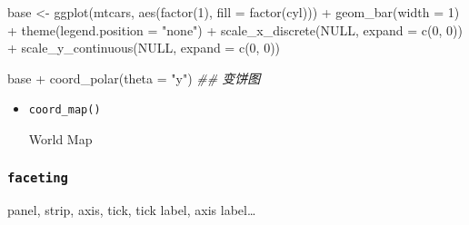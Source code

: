 \documentclass[
]{article}
\newenvironment{Shaded}{}{}
\newcommand{\AttributeTok}[1]{\textcolor[rgb]{0.49,0.56,0.16}{#1}}
\newcommand{\ConstantTok}[1]{\textcolor[rgb]{0.53,0.00,0.00}{#1}}
\newcommand{\DecValTok}[1]{\textcolor[rgb]{0.25,0.63,0.44}{#1}}
\newcommand{\DocumentationTok}[1]{\textcolor[rgb]{0.73,0.13,0.13}{\textit{#1}}}
\newcommand{\FunctionTok}[1]{\textcolor[rgb]{0.02,0.16,0.49}{#1}}
\newcommand{\NormalTok}[1]{#1}
\newcommand{\OtherTok}[1]{\textcolor[rgb]{0.00,0.44,0.13}{#1}}
\newcommand{\SpecialCharTok}[1]{\textcolor[rgb]{0.25,0.44,0.63}{#1}}
\newcommand{\StringTok}[1]{\textcolor[rgb]{0.25,0.44,0.63}{#1}}
\begin{document}
\begin{Shaded}
\begin{Highlighting}[]
\NormalTok{base }\OtherTok{\textless{}{-}} \FunctionTok{ggplot}\NormalTok{(mtcars, }\FunctionTok{aes}\NormalTok{(}\FunctionTok{factor}\NormalTok{(}\DecValTok{1}\NormalTok{), }\AttributeTok{fill =} \FunctionTok{factor}\NormalTok{(cyl))) }\SpecialCharTok{+}
  \FunctionTok{geom\_bar}\NormalTok{(}\AttributeTok{width =} \DecValTok{1}\NormalTok{) }\SpecialCharTok{+} \FunctionTok{theme}\NormalTok{(}\AttributeTok{legend.position =} \StringTok{"none"}\NormalTok{) }\SpecialCharTok{+} 
  \FunctionTok{scale\_x\_discrete}\NormalTok{(}\ConstantTok{NULL}\NormalTok{, }\AttributeTok{expand =} \FunctionTok{c}\NormalTok{(}\DecValTok{0}\NormalTok{, }\DecValTok{0}\NormalTok{)) }\SpecialCharTok{+}
  \FunctionTok{scale\_y\_continuous}\NormalTok{(}\ConstantTok{NULL}\NormalTok{, }\AttributeTok{expand =} \FunctionTok{c}\NormalTok{(}\DecValTok{0}\NormalTok{, }\DecValTok{0}\NormalTok{))}

\NormalTok{base }\SpecialCharTok{+} \FunctionTok{coord\_polar}\NormalTok{(}\AttributeTok{theta =} \StringTok{"y"}\NormalTok{) }\DocumentationTok{\#\# 变饼图}
\end{Highlighting}
\end{Shaded}

\begin{itemize}
\item
  \texttt{coord\_map()}

  World Map
\end{itemize}

\hypertarget{faceting}{%
\subsubsection{\texorpdfstring{\texttt{faceting}}{faceting}}\label{faceting}}

panel, strip, axis, tick, tick label, axis label\ldots{}
\end{document}
